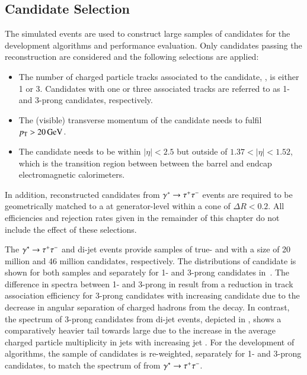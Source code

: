 \subsection{\tauhadvis Candidate Selection}

The simulated events are used to construct large samples of \tauhadvis
candidates for the development \tauid algorithms and performance
evaluation. Only \tauhadvis candidates passing the reconstruction are
considered and the following selections are applied:
\begin{itemize}

\item The number of charged particle tracks associated to the
  \tauhadvis candidate, \Ntracks, is either 1 or 3. Candidates with
  one or three associated tracks are referred to as 1- and 3-prong
  \tauhadvis candidates, respectively.

\item The (visible) transverse momentum of the candidate needs to
  fulfil $\pT > \SI{20}{\GeV}$.

\item The \tauhadvis candidate needs to be within $|\eta| < 2.5$ but
  outside of $1.37 < |\eta| < 1.52$, which is the transition region
  between between the barrel and endcap electromagnetic calorimeters.

\end{itemize}
In addition, reconstructed \tauhadvis candidates from
$\gamma^{*} \to \tau^{+} \tau^{-}$ events are required to be geometrically
matched to a \tauhad at generator-level within a cone of
$\Delta R < 0.2$.
All efficiencies and rejection rates given in the remainder of this
chapter do not include the effect of these selections.

The $\gamma^{*} \to \tau^{+} \tau^{-}$ and di-jet events provide samples of
true- and \faketauhadvis with a size of 20 million and 46 million
candidates, respectively. The distributions of \tauhadvis candidate
\pT is shown for both samples and separately for 1- and 3-prong
candidates in~. The difference in \pT
spectra between 1- and 3-prong \truetauhadvis in
 result from a reduction in
track association efficiency for 3-prong \tauhadvis candidates with
increasing candidate \pT due to the decrease in angular separation of
charged hadrons from the \taulepton decay. In contrast, the \pT
spectrum of 3-prong \tauhadvis candidates from di-jet events, depicted
in , shows a comparatively heavier
tail towards large \pT due to the increase in the average charged
particle multiplicity in jets with increasing jet \pT. For the
development of \tauid algorithms, the sample of \faketauhadvis
candidates is re-weighted, separately for 1- and 3-prong candidates,
to match the \pT spectrum of \truetauhadvis from
$\gamma^{*} \to \tau^{+} \tau^{-}$.

